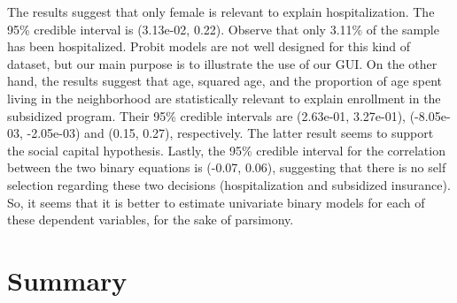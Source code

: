 The results suggest that only female is relevant to explain hospitalization.
The 95\% credible interval is (3.13e-02, 0.22).
Observe that only 3.11\% of the sample has been hospitalized.
Probit models are not well designed for this kind of dataset, but our main purpose is to illustrate the use of our GUI.
On the other hand, the results suggest that age, squared age, and the proportion of age spent living in the neighborhood are statistically relevant to explain enrollment in the subsidized program.
Their 95\% credible intervals are (2.63e-01, 3.27e-01), (-8.05e-03, -2.05e-03) and (0.15, 0.27), respectively.
The latter result seems to support the social capital hypothesis.
Lastly, the 95\% credible interval for the correlation between the two binary equations is (-0.07, 0.06), suggesting that there is no self selection regarding these two decisions (hospitalization and subsidized insurance).
So, it seems that it is better to estimate univariate binary models for each of these dependent variables, for the sake of parsimony.



\section{Summary}\label{sec75}

